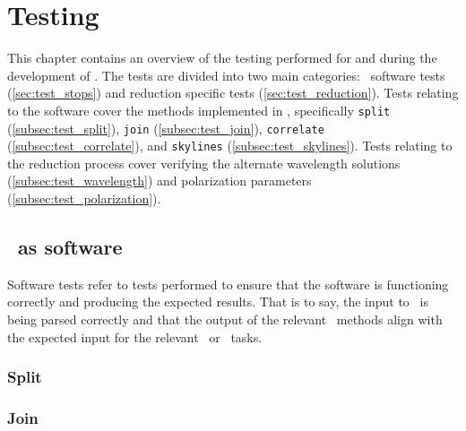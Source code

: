\chapter{Testing}

This chapter contains an overview of the testing performed for and during the development of \stops. The tests are divided into two main categories: \stops\ software tests (\autoref{sec:test_stops}) and reduction specific tests (\autoref{sec:test_reduction}). Tests relating to the software cover the methods implemented in \stops, specifically \texttt{split} (\autoref{subsec:test_split}), \texttt{join} (\autoref{subsec:test_join}), \texttt{correlate} (\autoref{subsec:test_correlate}), and \texttt{skylines} (\autoref{subsec:test_skylines}). Tests relating to the reduction process cover verifying the alternate wavelength solutions (\autoref{subsec:test_wavelength}) and polarization parameters (\autoref{subsec:test_polarization}).

\section{\stops\ as software} \label{sec:test_stops}

Software tests refer to tests performed to ensure that the software is functioning correctly and producing the expected results. That is to say, the input to \stops\ is being parsed correctly and that the output of the relevant \stops\ methods align with the expected input for the relevant \iraf\ or \polsalt\ tasks.



\subsection{Split} \label{subsec:test_split}


\subsection{Join} \label{subsec:test_join}


